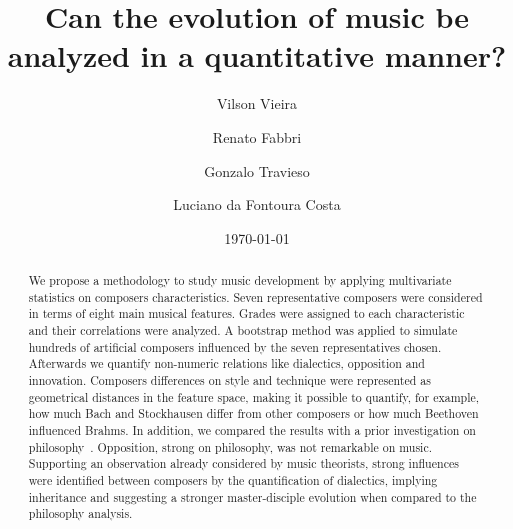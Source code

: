 \documentclass[
 aip,
 jmp,
 amsmath,amssymb,
 reprint,
]{revtex4-1}
\begin{document}

\title[Can the evolution of music be analyzed in a quantitative manner?]{Can the evolution of music be analyzed in a quantitative manner?}

\author{Vilson Vieira}

\author{Renato Fabbri}

\author{Gonzalo Travieso}

\author{Luciano da Fontoura Costa}

\date{\today}

\begin{abstract}

We propose a
methodology
to study music development by
applying multivariate statistics on composers characteristics.
Seven representative composers were considered in terms of
eight main musical features. 
Grades
were assigned to each characteristic and their correlations were
analyzed. 
A bootstrap method was
applied to simulate hundreds of artificial composers
influenced by the seven representatives chosen.
Afterwards we quantify non-numeric relations like dialectics, opposition
and innovation.
Composers differences on style and technique were represented
as geometrical distances in the feature space, making it possible to
quantify, for example, how much Bach and Stockhausen differ from other composers or how
much Beethoven influenced Brahms.
In addition, we compared the results with a prior investigation
on
philosophy~\cite{Fabbri}. Opposition, strong on
philosophy, was not remarkable on music. Supporting an observation already considered by music
theorists, strong influences were identified between
composers by the quantification of dialectics, implying inheritance and suggesting a stronger
master-disciple evolution when compared to the philosophy analysis.
\end{abstract}


\maketitle
\end{document}
